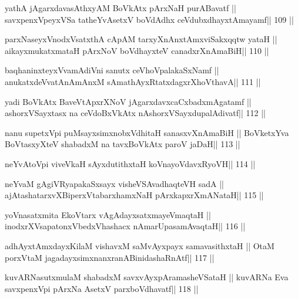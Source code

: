 \begin{shl}
yathA jAgarxdavasAthxyAM BoVkAtx pArxNaH purA\s Bavatf ||
savxpenxV\s peyxVSa tatheYvA\s\s setxV boVdAdhx ceVdubxdhayxtAmayamf\hfill || 109 ||
\end{shl}

\begin{shl}
parxNaseyxVnodxVsatxthA cApAM tarxyXnAnxtAmxviSakxqqtw yataH ||
aikayxmukatxmataH pArxNoV boVdhayxteV canadxrXnAmaBiH\hfill || 110 ||
\end{shl}

\begin{shl}
baqhaninxteyxVvamAdiVni sanutx ceVhoVpalakaSxNamf ||
anukatxdeVvatAnAmAnxM sAmathAyxRtatxdagxrXhoV\s thavA\hfill || 111 ||
\end{shl}

\begin{shl}
yadi BoVkAtx BaveVtApxrXNoV jAgarxdavxcaCxbadxmAgatamf ||
ashorxVSayxtasx na ceVdoBxVkAtx nAshorxVSayxdupalAdivatf\hfill || 112 ||
\end{shl}

\begin{shl}
nanu supetxV\s pi puMsayxsimxnobxVdhitaH sanasxvXnAmaBiH ||
BoVketxYva BoVtasxyXteV shabadxM na tavxBoVkAtx paroV jaDaH\hfill || 113 ||
\end{shl}

\begin{shl}
neYvAtoV\s pi viveVkaH sAyxdutithxtaH koV\s nayoVdavxRyoVH\hfill || 114 ||
\end{shl}

\begin{shl}
neYvaM gAgiVRyapakaSxsayx visheVSAvadhaqteVH sadA ||
ajAtashatarxvXBiperxVtabarxhamxNaH  pArxkapxrXmANataH\hfill || 115 ||
\end{shl}

\begin{shl}
yoV\s nasatxmita EkoV\s tarx vAgAdayxsatxmayeV\s maqtaH ||
inodxrXV\s sapatonxV\s bedxVhashacx nAmarUpasamAvaqtaH\hfill || 116 ||
\end{shl}

\begin{shl}
adhAyxtAmxdayxKilaM vishavxM saMvAyxpayx samavasithxtaH ||
OtaM porxVtaM jagadayxsimxnanxranABinidashaRnAtf\hfill || 117 ||
\end{shl}

\begin{shl}
kuvARNasutxmulaM shabadxM savxvAyxpAramasheVSataH ||
kuvARNa Eva savxpenxV\s pi pArxNa AsetxV parxboVdhavatf\hfill || 118 ||
\end{shl}

